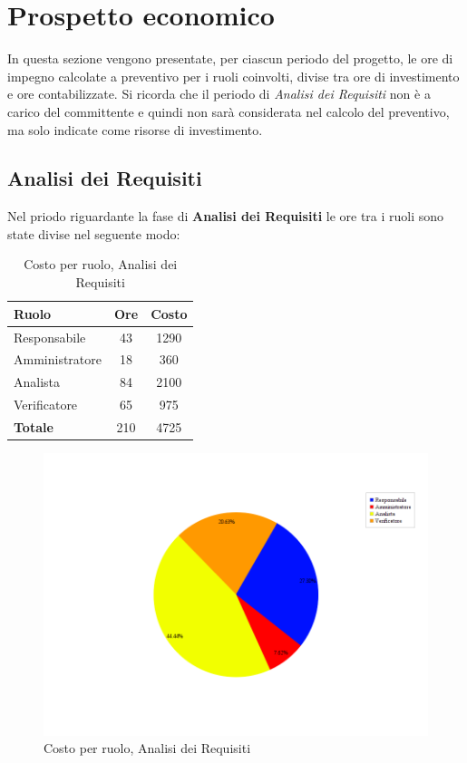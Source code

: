 \section{Prospetto economico}
In questa sezione vengono presentate, per ciascun periodo del progetto, le ore di impegno calcolate a preventivo per i ruoli coinvolti, divise tra ore di investimento e ore contabilizzate. Si ricorda che il periodo di \textit{Analisi dei Requisiti} non è a carico del committente e quindi non sarà considerata nel calcolo del preventivo, ma solo indicate come risorse di investimento.
\subsection{Analisi dei Requisiti}
Nel priodo riguardante la fase di \textbf{Analisi dei Requisiti} le ore tra i ruoli sono state divise nel seguente modo:

\begin{table}[H]
	\begin{center}
		\begin{tabular}{|l|c|c|}
			\hline
			\textbf{Ruolo}	& \textbf{Ore} & \textbf{Costo} \\
			\hline
			Responsabile	&	43	&	 1290	\\
			\hline
			Amministratore	&	18	&	 360	\\
			\hline
			Analista		&	84	&	 2100	\\
			\hline
			Verificatore	&	65	&	 975	\\
			\hline
			\textbf{Totale} &	210	&	4725	\\
			\hline
		\end{tabular}
	\end{center}
	\caption{Costo per ruolo, Analisi dei Requisiti}
\end{table}

\begin{figure}[H]
	\centering
	\includegraphics[scale=0.4]{immagini/Grafi/CostoAR}
	\caption{Costo per ruolo, Analisi dei Requisiti}
\end{figure}

